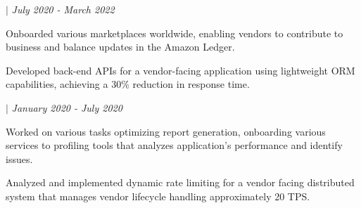     \hspace{17pt}  $|$ \textit{July 2020 - March 2022 }
    \experienceItemListStart
        \item  Onboarded various marketplaces worldwide, enabling vendors to contribute to business and balance updates in the Amazon Ledger.  
        \item  Developed back-end APIs for a vendor-facing application using lightweight ORM capabilities, achieving a 30\% reduction in response time. 
    \experienceItemListEnd

    \hspace{17pt}  $|$ \textit{January 2020 - July 2020}
    \experienceItemListStart
        \item  Worked on various tasks optimizing report generation, onboarding various services to profiling tools that analyzes application's performance and identify issues.
        \item  Analyzed and implemented dynamic rate limiting for a vendor facing distributed system that manages vendor lifecycle handling approximately 20 TPS. 
    \experienceItemListEnd

